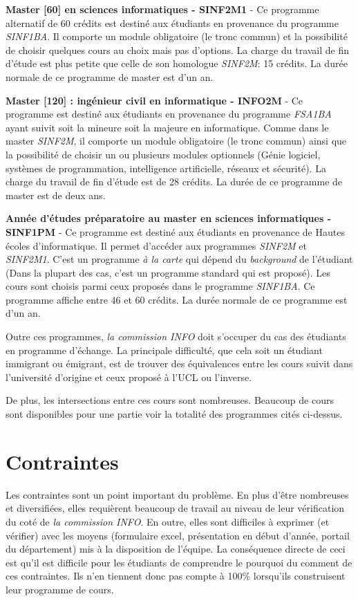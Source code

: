 \textbf{Master [60] en sciences informatiques - SINF2M1} \cite{SINF2M1} - Ce programme alternatif de 60 crédits est destiné aux étudiants en provenance du programme \textit{SINF1BA}. Il comporte un module obligatoire (le tronc commun) et la possibilité de choisir quelques cours au choix mais pas d'options. La charge du travail de fin d'étude est plus petite que celle de son homologue  \textit{SINF2M}: 15 crédits. La durée normale de ce programme de master est d'un an. 

\textbf{Master [120] : ingénieur civil en informatique - INFO2M} \cite{INFO2M} - Ce programme est destiné aux étudiants en provenance du programme \textit{FSA1BA} ayant suivit soit la mineure soit la majeure en informatique. Comme dans le master \textit{SINF2M}, il comporte un module obligatoire (le tronc commun) ainsi que la possibilité de choisir un ou plusieurs modules optionnels (Génie logiciel, systèmes de programmation, intelligence artificielle, réseaux et sécurité). La charge du travail de fin d'étude est de 28 crédits. La durée de ce programme de master est de deux ans.  

\textbf{Année d'études préparatoire au master en sciences informatiques - SINF1PM} \cite{SINF1PM} - Ce programme est destiné aux étudiants en provenance de Hautes écoles d'informatique. Il permet d'accéder aux programmes \textit{SINF2M} et \textit{SINF2M1}. C'est un programme \textit{à la carte} qui dépend du \textit{background} de l'étudiant (Dans la plupart des cas, c'est un programme standard qui est proposé). Les cours sont choisis parmi ceux proposés dans le programme \textit{SINF1BA}. Ce programme affiche entre 46 et 60 crédits. La durée normale de ce programme est d'un an.  
 

Outre ces programmes, \textit{la commission INFO} doit s'occuper du cas des étudiants en programme d'échange. La principale difficulté, que cela soit un étudiant immigrant ou émigrant, est de trouver des équivalences entre les cours suivit dans l'université d'origine et ceux proposé à l'UCL ou l'inverse. 

De plus, les intersections entre ces cours sont nombreuses. Beaucoup de cours sont disponibles pour une partie voir la totalité des programmes cités ci-dessus.  
\clearpage
\section{Contraintes}
\label{contraintes_intro}

Les contraintes sont un point important du problème. En plus d'être nombreuses et diversifiées, elles requièrent beaucoup de travail au niveau de leur vérification du coté de \textit{la commission INFO}. En outre, elles sont difficiles à exprimer (et vérifier) avec les moyens (formulaire excel, présentation en début d'année, portail du département) mis à la disposition de l'équipe. La conséquence directe de ceci est qu'il est difficile pour les étudiants de comprendre le pourquoi du comment de ces contraintes. Ils n'en tiennent donc pas compte à 100\% lorsqu'ils construisent leur programme de cours.

